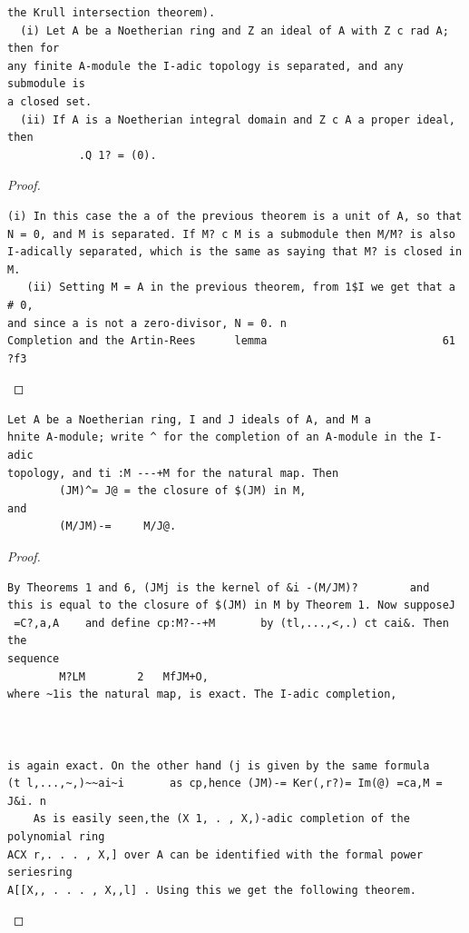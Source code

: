 \begin{theorem}\label{mcrt-auto-theorem-8-10}\uses{}
\begin{verbatim}
the Krull intersection theorem).
  (i) Let A be a Noetherian ring and Z an ideal of A with Z c rad A; then for
any finite A-module the I-adic topology is separated, and any submodule is
a closed set.
  (ii) If A is a Noetherian integral domain and Z c A a proper ideal, then
           .Q 1? = (0).
\end{verbatim}
\end{theorem}
\begin{proof}
\begin{verbatim}
(i) In this case the a of the previous theorem is a unit of A, so that
N = 0, and M is separated. If M? c M is a submodule then M/M? is also
I-adically separated, which is the same as saying that M? is closed in M.
   (ii) Setting M = A in the previous theorem, from 1$I we get that a # 0,
and since a is not a zero-divisor, N = 0. n
Completion and the Artin-Rees      lemma                           61
?f3
\end{verbatim}
\end{proof}


\begin{theorem}\label{mcrt-auto-theorem-8-11}\uses{}
\begin{verbatim}
Let A be a Noetherian ring, I and J ideals of A, and M a
hnite A-module; write ^ for the completion of an A-module in the I-adic
topology, and ti :M ---+M for the natural map. Then
        (JM)^= J@ = the closure of $(JM) in M,
and
        (M/JM)-=     M/J@.
\end{verbatim}
\end{theorem}
\begin{proof}
\begin{verbatim}
By Theorems 1 and 6, (JMj is the kernel of &i -(M/JM)?        and
this is equal to the closure of $(JM) in M by Theorem 1. Now supposeJ
 =C?,a,A    and define cp:M?--+M       by (tl,...,<,.) ct cai&. Then the
sequence
        M?LM        2   MfJM+O,
where ~1is the natural map, is exact. The I-adic completion,



is again exact. On the other hand (j is given by the same formula
(t l,...,~,)~~ai~i       as cp,hence (JM)-= Ker(,r?)= Im(@) =ca,M = J&i. n
    As is easily seen,the (X 1, . , X,)-adic completion of the polynomial ring
ACX r,. . . , X,] over A can be identified with the formal power seriesring
A[[X,, . . . , X,,l] . Using this we get the following theorem.
\end{verbatim}
\end{proof}


